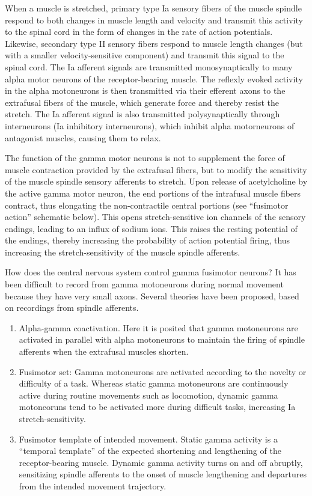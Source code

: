 When a muscle is stretched, primary type Ia sensory fibers of the muscle spindle respond to both changes in muscle length and velocity and transmit this activity to the spinal cord in the form of changes in the rate of action potentials. Likewise, secondary type II sensory fibers respond to muscle length changes (but with a smaller velocity-sensitive component) and transmit this signal to the spinal cord. The Ia afferent signals are transmitted monosynaptically to many alpha motor neurons of the receptor-bearing muscle. The reflexly evoked activity in the alpha motoneurons is then transmitted via their efferent axons to the extrafusal fibers of the muscle, which generate force and thereby resist the stretch. The Ia afferent signal is also transmitted polysynaptically through interneurons (Ia inhibitory interneurons), which inhibit alpha motorneurons of antagonist muscles, causing them to relax.

The function of the gamma motor neurons is not to supplement the force of muscle contraction provided by the extrafusal fibers, but to modify the sensitivity of the muscle spindle sensory afferents to stretch. Upon release of acetylcholine by the active gamma motor neuron, the end portions of the intrafusal muscle fibers contract, thus elongating the non-contractile central portions (see ``fusimotor action'' schematic below). This opens stretch-sensitive ion channels of the sensory endings, leading to an influx of sodium ions. This raises the resting potential of the endings, thereby increasing the probability of action potential firing, thus increasing the stretch-sensitivity of the muscle spindle afferents.

How does the central nervous system control gamma fusimotor neurons? It has been difficult to record from gamma motoneurons during normal movement because they have very small axons. Several theories have been proposed, based on recordings from spindle afferents.

\begin{enumerate}
\def\labelenumi{\arabic{enumi}.}
\tightlist
\item
  Alpha-gamma coactivation. Here it is posited that gamma motoneurons are activated in parallel with alpha motoneurons to maintain the firing of spindle afferents when the extrafusal muscles shorten.
\item
  Fusimotor set: Gamma motoneurons are activated according to the novelty or difficulty of a task. Whereas static gamma motoneurons are continuously active during routine movements such as locomotion, dynamic gamma motoneoruns tend to be activated more during difficult tasks, increasing Ia stretch-sensitivity.
\item
  Fusimotor template of intended movement. Static gamma activity is a ``temporal template'' of the expected shortening and lengthening of the receptor-bearing muscle. Dynamic gamma activity turns on and off abruptly, sensitizing spindle afferents to the onset of muscle lengthening and departures from the intended movement trajectory.
\end{enumerate}

